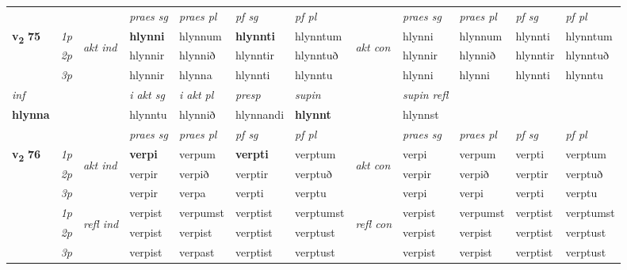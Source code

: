 \begin{longtable}[l]{X>{\footnotesize\itshape}llXXXXlXXXX}
 & &   & \textit{praes sg}  & \textit{praes pl}    & \textit{ pf sg} & \textit{pf pl} & & \textit{praes sg}  & \textit{praes pl}    & \textit{pf sg} & \textit{pf pl }  \\ \cmidrule{4-7} \cmidrule{9-12}
 \multirow{2}{*}{{{\textbf{v{\textsubscript{2}}} \Large{\textbf{75}}}}}  & 1p & \multirow{3}{*}{\begin{turn}{90}\textit{akt ind}\end{turn}} & \textbf{hlynni} & hlynnum & \textbf{hlynnti} & hlynntum & \multirow{3}{*}{\begin{turn}{90}\textit{akt con}\end{turn}} &hlynni & hlynnum & hlynnti & hlynntum\\*
 & 2p &  &  hlynnir  & hlynnið & hlynntir & hlynntuð & & hlynnir & hlynnið & hlynntir & hlynntuð \\*
 & 3p &  & hlynnir & hlynna & hlynnti & hlynntu & & hlynni & hlynni& hlynnti & hlynntu \\*
\cmidrule{4-7} \cmidrule{9-12}

   {\textit{inf}} & &  & \textit{i akt sg} & \textit{i akt pl}   & \textit{presp} & \textit{supin} && \textit{supin refl}  \\*
  {\textbf{hlynna}} & && hlynntu  & hlynnið   & hlynnandi &  \textbf{hlynnt} && hlynnst  \\*

\midrule

 & &   & \textit{praes sg}  & \textit{praes pl}    & \textit{ pf sg} & \textit{pf pl} & & \textit{praes sg}  & \textit{praes pl}    & \textit{pf sg} & \textit{pf pl }  \\ \cmidrule{4-7} \cmidrule{9-12}
 \multirow{2}{*}{{{\textbf{v{\textsubscript{2}}} \Large{\textbf{76}}}}}  & 1p & \multirow{3}{*}{\begin{turn}{90}\textit{akt ind}\end{turn}} & \textbf{verpi} & verpum & \textbf{verpti} & verptum & \multirow{3}{*}{\begin{turn}{90}\textit{akt con}\end{turn}} &verpi & verpum & verpti & verptum\\*
 & 2p &  &  verpir  & verpið & verptir & verptuð & & verpir & verpið & verptir & verptuð \\*
 & 3p &  & verpir & verpa & verpti & verptu & & verpi & verpi& verpti & verptu \\*
\cmidrule{4-7} \cmidrule{9-12}
 & 1p & \multirow{3}{*}{\begin{turn}{90}\textit{refl ind}\end{turn}}  & verpist & verpumst & verptist & verptumst & \multirow{3}{*}{\begin{turn}{90}\textit{refl con}\end{turn}}  &verpist & verpumst & verptist & verptumst \\*
 & 2p &  & verpist & verpist & verptist & verptust & &verpist & verpist & verptist & verptust \\*
 & 3p  & & verpist & verpast & verptist & verptust & & verpist & verpist& verptist & verptust \\*
\cmidrule{4-7} \cmidrule{9-12}


\end{longtable}
